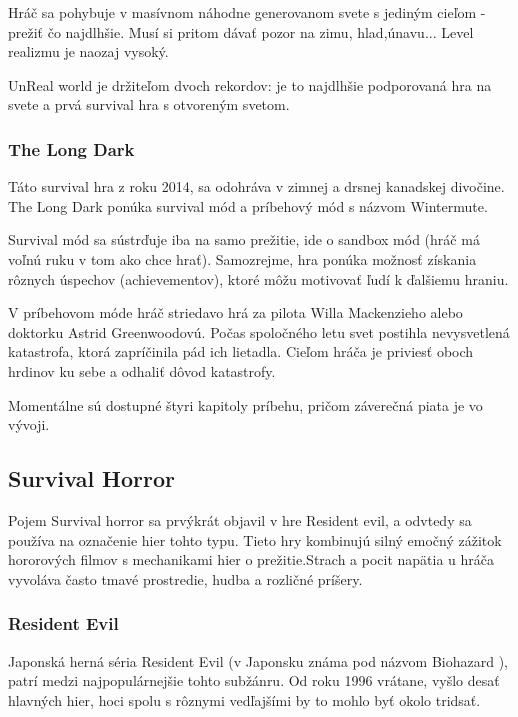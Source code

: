\documentclass[10pt,oneoside,slovak,a4paper]{article}
\begin{document}
Hráč sa pohybuje v masívnom náhodne generovanom svete s jediným cieľom - prežiť čo najdlhšie. Musí si pritom dávať pozor na zimu, hlad,únavu... Level realizmu je naozaj vysoký.

UnReal world je držiteľom dvoch rekordov: je to najdlhšie podporovaná hra na svete a prvá survival hra s otvoreným svetom. \cite{UnRealWorld}

\subsubsection{The Long Dark}

Táto survival hra z roku 2014, sa odohráva v zimnej a drsnej kanadskej divočine. The Long Dark ponúka survival mód a príbehový mód s názvom Wintermute.

Survival mód sa  sústrďuje iba na samo prežitie, ide o sandbox  mód (hráč má voľnú ruku v tom ako chce hrať).  Samozrejme, hra ponúka  možnosť získania rôznych úspechov (achievementov), ktoré môžu motivovať ľudí k ďalšiemu hraniu. \cite{Virtanen}

V príbehovom móde hráč striedavo hrá za pilota Willa Mackenzieho  alebo doktorku  Astrid Greenwoodovú. Počas spoločného letu svet postihla nevysvetlená katastrofa, ktorá zapríčinila pád ich lietadla. Cieľom hráča je priviesť oboch hrdinov ku sebe a odhaliť dôvod katastrofy. \cite{Virtanen}

Momentálne sú dostupné štyri kapitoly príbehu, pričom záverečná piata je vo vývoji.


\subsection{Survival Horror}
Pojem Survival horror sa prvýkrát objavil v hre Resident evil, a odvtedy sa používa na označenie hier tohto typu. \cite{Kirkland} Tieto hry kombinujú silný emočný zážitok hororových filmov s mechanikami hier o prežitie.Strach a pocit napätia u hráča vyvoláva často  tmavé prostredie, hudba a rozličné príšery.

\subsubsection{Resident Evil}
Japonská herná séria Resident Evil (v Japonsku známa pod názvom Biohazard \cite{Capcom}), patrí medzi najpopulárnejšie tohto subžánru. Od roku 1996 vrátane, vyšlo desať hlavných hier, hoci spolu s rôznymi vedľajšími by to mohlo byť okolo tridsať.  \cite{ResEv}
\end{document}
